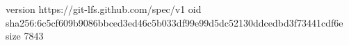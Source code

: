 version https://git-lfs.github.com/spec/v1
oid sha256:6c5cf609b9086bbced3ed46c5b033df99e99d5dc52130ddcedbd3f73441cdf6e
size 7843
